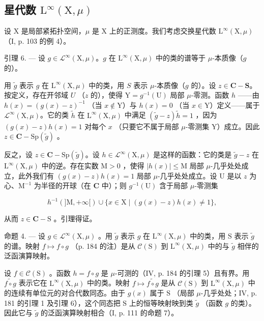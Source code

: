 \subsection{\texorpdfstring{星代数 \(\mathrm{L}^{\infty}(\mathrm{X},\mu)\)}{星代数 \textbackslash mathrm\{L\}\^{}\{\textbackslash infty\}(\textbackslash mathrm\{X\},\textbackslash mu)}}

设 X 是局部紧拓扑空间，\(\mu\) 是 X 上的正测度。我们考虑交换星代数 \(\mathrm{L}^{\infty}(\mathrm{X},\mu)\) （I, p. 103 的例 4）。

引理 6. --- 设 \(g \in \mathcal{L}^{\infty}(\mathrm{X}, \mu)\)。\(g\) 在 \(\mathrm{L}^{\infty}(\mathrm{X}, \mu)\) 中的类的谱等于 \(\mu\)-本质像（\(g\) 的）。

用 \(\widetilde{g}\) 表示 \(g\) 在 \(\mathrm{L}^{\infty}(\mathrm{X},\mu)\) 中的类，用 \(S\) 表示 \(\mu\)-本质像（\(g\) 的）。设 \(z\in \mathbf{C} - \mathbf{S}\)。按定义，存在开邻域 \(U\) （\(z\) 的），使得 \(\mathrm{Y} = g^{-1}(\mathrm{U})\) 局部 \(\mu\)-零测。函数 \(h\) ——由 \(h(x) = (g(x) - z)^{-1}\) （当 \(x\notin \mathrm{Y}\)）与 \(h(x) = 0\) （当 \(x\in \mathrm{Y}\)）定义——属于 \(\mathcal{L}^{\infty}(\mathrm{X},\mu)\)。它的类 \(\widetilde{h}\) 在 \(\mathrm{L}^{\infty}(\mathrm{X},\mu)\) 中满足 \((\widetilde{g} -z)\widetilde{h} = 1\) ，因为 \((g(x) - z)h(x) = 1\) 对每个 \(x\) （只要它不属于局部 \(\mu\)-零测集 Y）成立。因此 \(z\in \mathbf{C} - \mathrm{Sp}(\widetilde{g})\) 。

反之，设 \(z \in \mathbf{C} - \mathrm{Sp}(\widetilde{g})\)。设 \(h \in \mathcal{L}^{\infty}(\mathrm{X},\mu)\) 是这样的函数：它的类是 \(\widetilde{g} - z\) 在 \(\mathrm{L}^{\infty}(\mathrm{X},\mu)\) 中的逆。存在实数 \(\mathrm{M} > 0\) ，使得 \(|h(x)| \leqslant \mathrm{M}\) 局部 \(\mu\)-几乎处处成立，此外我们有 \((g(x) - z)h(x) = 1\) 局部 \(\mu\)-几乎处处成立。设 U 是以 \(z\) 为心、\(\mathrm{M}^{-1}\) 为半径的开球（在 \(\mathbf{C}\) 中）；则 \(g^{-1}(\mathrm{U})\) 含于局部 \(\mu\)-零测集

\[
h ^ { - 1 } ( ] \mathrm{M} , + \infty [ ) \cup \{ x \in \mathrm{X} \mid ( g ( x ) - z ) h ( x ) \neq 1 \} ,
\]

从而 \(z \in \mathbf{C} - \mathrm{S}\) 。引理得证。

命题 4. --- 设 \(g \in \mathcal{L}^{\infty}(\mathrm{X},\mu)\) 。用 \(\widetilde{g}\) 表示 \(g\) 在 \(\mathrm{L}^{\infty}(\mathrm{X},\mu)\) 中的类，用 \(\mathrm{S}\) 表示 \(\widetilde{g}\) 的谱。映射 \(f \mapsto f \circ g\) （p. 184 的注）是从 \(\mathcal{C}(\mathrm{S})\) 到 \(\mathrm{L}^{\infty}(\mathrm{X},\mu)\) 中的与 \(\widetilde{g}\) 相伴的泛函演算映射。

设 \(f \in \mathcal{C}(\mathrm{S})\) 。函数 \(h = f \circ g\) 是 \(\mu\)-可测的（IV, p. 184 的引理 5）且有界。用 \(\widetilde{f \circ g}\) 表示它在 \(\mathrm{L}^{\infty}(\mathrm{X},\mu)\) 中的类。映射 \(f \mapsto \widetilde{f \circ g}\) 是从 \(\mathcal{C}(\mathrm{S})\) 到 \(\mathrm{L}^{\infty}(\mathrm{X},\mu)\) 中的连续有单位元的对合代数同态。由于 \(g(x)\) 属于 \(\mathrm{S}\) （局部 \(\mu\)-几乎处处；IV, p. 181 的引理 1 及引理 6），这个同态把 \(\mathrm{S}\) 上的恒等映射映到类 \(\widetilde{g}\) （函数 \(g\) 的类）。因此它与 \(\widetilde{g}\) 的泛函演算映射相合（I, p. 111 的命题 7）。
\relax{}
